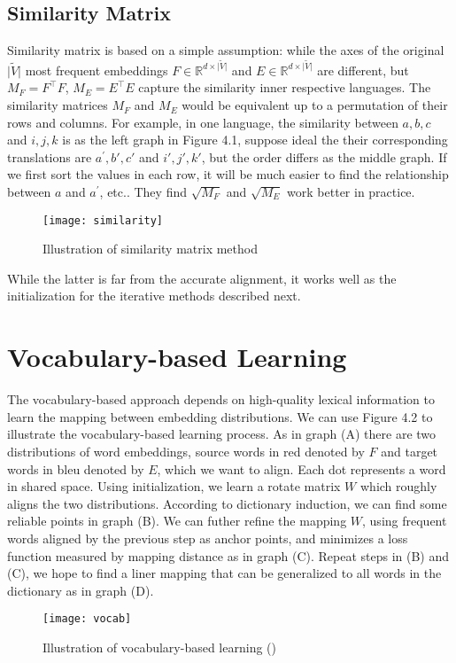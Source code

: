 \subsection{Similarity Matrix}
Similarity matrix is based on a simple assumption: while the axes of the original ${\lvert \tilde{V} \rvert}$ most frequent embeddings ${F \in \mathbb{R}^{d \times {\lvert \tilde{V} \rvert} }}$ and ${E \in \mathbb{R}^{d \times {\lvert \tilde{V} \rvert} }}$  are different, but $M_F=F^{\top}F$, $M_E = E^{\top}E$ capture the similarity inner respective languages. The similarity matrices $M_F$ and $M_E$ would be equivalent up to a permutation of their rows and columns. For example, in one language, the similarity between $a,b,c$ and $i,j,k$ is as the left graph in Figure 4.1, suppose ideal the their corresponding translations are $a^{\prime},b{\prime},c{\prime}$ and $i{\prime},j{\prime},k{\prime}$, but the order differs as the middle graph. If we first sort the values in each row, it will be much easier to find the relationship between $a$ and $a^{\prime}$, etc.. They find $\sqrt{M_F}$ and $\sqrt{M_E}$ 
work better in practice.
\begin{figure}[H]
	\texttt{[image: similarity]}
	\centering
	\caption{Illustration of similarity matrix method}
\end{figure}

While the latter is far from the accurate alignment, it works well as the initialization for the iterative methods described next.
\section{Vocabulary-based Learning}
The vocabulary-based approach depends on high-quality lexical information to learn the mapping between embedding distributions.
We can use Figure 4.2 to illustrate the vocabulary-based learning process. As in graph (A) there are two distributions of word embeddings, source words in red denoted by $F$ and target words in bleu denoted by $E$, which we want to align. Each dot represents a word in shared space. Using initialization, we learn a rotate matrix $W$ which roughly aligns the two distributions. According to dictionary induction, we can find some reliable points in graph (B). We can futher refine the mapping $W$, using frequent words aligned by the previous step as anchor points, and minimizes a loss function measured by mapping distance as in graph (C). Repeat steps in (B) and (C), we hope to find a liner mapping that can be generalized to all words in the dictionary as in graph (D).
\begin{figure}[H]
	\texttt{[image: vocab]}
	\centering
	\caption{Illustration of vocabulary-based learning (\cite{DBLP:journals/corr/abs-1710-04087})}
\end{figure}

